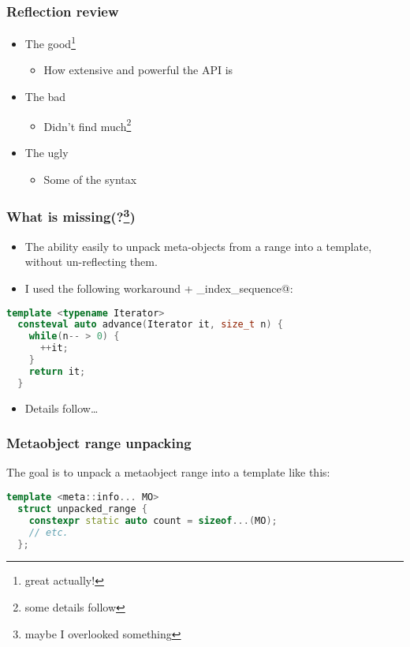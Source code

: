 \documentclass[compress,table,xcolor=table]{beamer}
\begin{document}
\begin{frame}
  \frametitle{Reflection review}
    \Huge
    \begin{itemize}
    \item{The good\footnote{great actually!}}
        \begin{itemize}
        \Large
        \item{How extensive and powerful the API is}
        \end{itemize}
    \item{The bad}
        \begin{itemize}
        \Large
        \item{Didn't find much\footnote{some details follow}}
        \end{itemize}
    \item{The ugly}
        \begin{itemize}
        \Large
        \item{Some of the syntax}
        \end{itemize}
    \end{itemize}
\end{frame}
\begin{frame}[fragile]
\frametitle{What is missing(?\footnote{maybe I overlooked something})}
    \Large
    \begin{itemize}
    \item The ability easily to unpack meta-objects from a range into a template,
        without un-reflecting them.
    \item I used the following workaround + \verb@make_index_sequence@:
    \end{itemize}
    \begin{lstlisting}[language=c++]
  template <typename Iterator>
  consteval auto advance(Iterator it, size_t n) {
    while(n-- > 0) {
      ++it;
    }
    return it;
  }
    \end{lstlisting}
    \begin{itemize}
    \item Details follow\ldots
    \end{itemize}
\end{frame}
\begin{frame}[fragile]
\frametitle{Metaobject range unpacking}
  \Large
  The goal is to unpack a metaobject range into a template like this:
    \begin{lstlisting}[language=c++]
  template <meta::info... MO>
  struct unpacked_range {
    constexpr static auto count = sizeof...(MO);
    // etc.
  };
    \end{lstlisting}
\end{frame}
\end{document}
